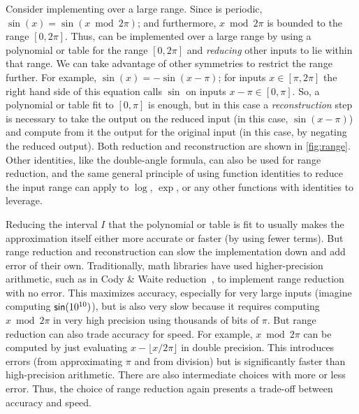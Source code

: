 \documentclass[paper.tex]{subfiles}
\begin{document}
Consider implementing  over a large range.
Since  is periodic, $\sin(x) = \sin(x \bmod 2\pi)$;
  and furthermore, $x \bmod 2\pi$ is bounded
  to the range $[0, 2\pi]$.
Thus,  can be implemented over a large range
  by using a polynomial or table for the range $[0, 2\pi]$
  and \emph{reducing} other inputs to lie within that range.
We can take advantage of other symmetries
  to restrict the range further.
For example, $\sin(x) = -\sin(x - \pi)$;
  for inputs $x \in [\pi, 2\pi]$ the right hand side of this equation
  calls $\sin$ on inputs $x - \pi \in [0, \pi]$.
So, a polynomial or table fit to $[0, \pi]$ is enough,
  but in this case a \emph{reconstruction} step is necessary
  to take the output on the reduced input
  (in this case, $\sin(x - \pi)$)
  and compute from it the output for the original input
  (in this case, by negating the reduced output).
Both reduction and reconstruction are shown in \cref{fig:range}.
Other identities, like the double-angle formula,
  can also be used for range reduction,
  and the same general principle
  of using function identities to reduce the input range
  can apply to $\log$, $\exp$, or any other functions
  with identities to leverage.

Reducing the interval $I$ that the polynomial or table is fit to
  usually makes the approximation itself
  either more accurate or faster (by using fewer terms).
But range reduction and  reconstruction
  can slow the implementation down
  and add error of their own.
Traditionally, math libraries have used higher-precision arithmetic,
  such as in Cody \& Waite reduction~\cite{cody-waite},
  to implement range reduction with no error.
This maximizes accuracy, especially for very large inputs
  (imagine computing $\text{\textsf{sin}}(10^{10})$),
  but is also very slow because it requires computing $x \bmod 2\pi$
  in very high precision using thousands of bits of $\pi$.
But range reduction can also trade accuracy for speed.
For example, $x \bmod 2\pi$ can be computed
  by just evaluating $x - \lfloor x / 2 \pi \rfloor$ in double precision.
This introduces errors
  (from approximating $\pi$ and from division)
  but is significantly faster than high-precision arithmetic.
There are also intermediate choices with more or less error.
Thus, the choice of range reduction
  again presents a trade-off between accuracy and speed.
\end{document}
